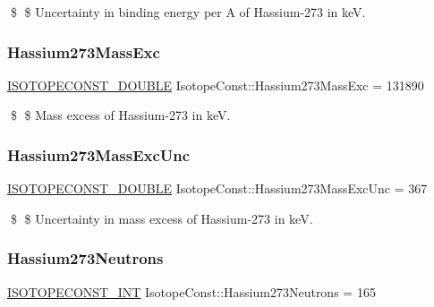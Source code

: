 \$ \$ Uncertainty in binding energy per A of Hassium-\/273 in keV. \mbox{\label{group___isotope_const-_hassium-_hs273_gadcc92360992da0ac3319792a74ca2f10}} 
\subsubsection{\texorpdfstring{Hassium273\+Mass\+Exc}{Hassium273MassExc}}
{\footnotesize\ttfamily \mbox{\hyperlink{group___isotope_const-_macros_ga8f45a7272ce02c0b4c65c44636ed719a}{I\+S\+O\+T\+O\+P\+E\+C\+O\+N\+S\+T\+\_\+\+D\+O\+U\+B\+LE}} Isotope\+Const\+::\+Hassium273\+Mass\+Exc = 131890}

\$ \$ Mass excess of Hassium-\/273 in keV. \mbox{\label{group___isotope_const-_hassium-_hs273_ga66da90f56c3d51601d5e103fb6f9cdbd}} 
\subsubsection{\texorpdfstring{Hassium273\+Mass\+Exc\+Unc}{Hassium273MassExcUnc}}
{\footnotesize\ttfamily \mbox{\hyperlink{group___isotope_const-_macros_ga8f45a7272ce02c0b4c65c44636ed719a}{I\+S\+O\+T\+O\+P\+E\+C\+O\+N\+S\+T\+\_\+\+D\+O\+U\+B\+LE}} Isotope\+Const\+::\+Hassium273\+Mass\+Exc\+Unc = 367}

\$ \$ Uncertainty in mass excess of Hassium-\/273 in keV. \mbox{\label{group___isotope_const-_hassium-_hs273_ga90ba25db577b8c02ee506304edb78236}} 
\subsubsection{\texorpdfstring{Hassium273\+Neutrons}{Hassium273Neutrons}}
{\footnotesize\ttfamily \mbox{\hyperlink{group___isotope_const-_macros_ga5f18360b3e99483a35c32d789e62621c}{I\+S\+O\+T\+O\+P\+E\+C\+O\+N\+S\+T\+\_\+\+I\+NT}} Isotope\+Const\+::\+Hassium273\+Neutrons = 165}


